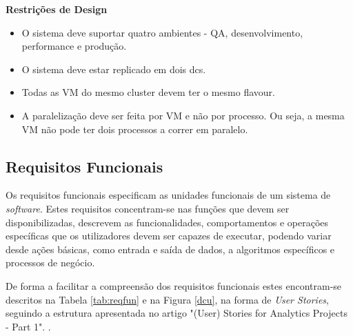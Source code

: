 \textbf{Restrições de Design}
\begin{itemize}
  \item O sistema deve suportar quatro ambientes - \ac{QA}, desenvolvimento, 
    performance e produção.
  \item O sistema deve estar replicado em dois \glspl{dc}.
  \item Todas as \ac{VM} do mesmo \gls{cluster} devem ter o mesmo \gls{flavour}.
  \item A paralelização deve ser feita por \ac{VM} e não por processo. Ou seja, a mesma \ac{VM} 
    não pode ter dois processos a correr em paralelo.
\end{itemize}

\subsection{Requisitos Funcionais}
\label{sec:3-rf}

Os requisitos funcionais especificam as unidades funcionais de um sistema de \textit{software}.
Estes requisitos concentram-se nas funções que devem ser disponibilizadas, descrevem as
funcionalidades, comportamentos e operações específicas que os utilizadores devem ser capazes de 
executar, podendo variar desde ações básicas, como entrada e saída de dados, a algoritmos 
específicos e processos de negócio.

De forma a facilitar a compreensão dos requisitos funcionais estes encontram-se descritos na 
Tabela \ref{tab:reqfun} e na Figura \ref{dcu}, na forma de \textit{User Stories}, seguindo a 
estrutura apresentada no artigo "(User) Stories for Analytics Projects - Part 1". \cite{us}.


